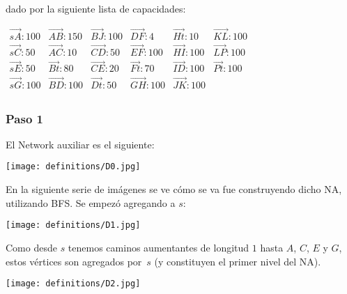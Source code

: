 \documentclass[10pt,a4paper]{article}
\begin{document}
dado por la siguiente lista de capacidades:

$\begin{array}{llllll} \overrightarrow{sA}: 100& \overrightarrow{AB}: 150&\overrightarrow{BJ}: 100&\overrightarrow{DF}: 4&\overrightarrow{Ht}:10&\overrightarrow{KL}: 100\\ \overrightarrow{sC}: 50& \overrightarrow{AC}: 10&\overrightarrow{CD}: 50&\overrightarrow{EF}: 100&\overrightarrow{HI}: 100&\overrightarrow{LP}: 100\\ \overrightarrow{sE}: 50& \overrightarrow{Bt}: 80&\overrightarrow{CE}: 20&\overrightarrow{Ft}: 70&\overrightarrow{ID}: 100&\overrightarrow{Pt}: 100\\ \overrightarrow{sG}:100& \overrightarrow{BD}: 100&\overrightarrow{Dt}:50&\overrightarrow{GH}: 100&\overrightarrow{JK}: 100&\\ \end{array}$

\subsubsection*{Paso 1}

El Network auxiliar es el siguiente:

\begin{center}

    \begin{adjustbox}{max size={\textwidth}{\textheight}}
        \texttt{[image: definitions/D0.jpg]}
        \end{adjustbox}
    
\end{center}

En la siguiente serie de imágenes se ve cómo se va fue construyendo dicho NA, utilizando BFS. Se empezó agregando a $s$:

\begin{center}


    \begin{adjustbox}{max size={\textwidth}{\textheight}}
        \texttt{[image: definitions/D1.jpg]}
        \end{adjustbox}
    
\end{center}

Como desde $s$ tenemos caminos aumentantes de longitud $1$ hasta $A$, $C$, $E$ y $G$, estos vértices son agregados por $s$ (y constituyen el primer nivel del NA).

\begin{center}

    \begin{adjustbox}{max size={\textwidth}{\textheight}}
        \texttt{[image: definitions/D2.jpg]}
        \end{adjustbox}
    
\end{center}
\end{document}
